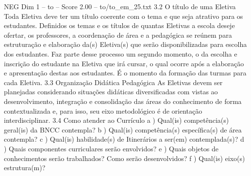 \begin{textsample}{NEG Dim 1 – to – Score 2.00 – to/to\_em\_25.txt}  \label{ex:f1_neg_032}
3.2 O título de uma Eletiva Toda Eletiva deve ter um título coerente com o tema e que seja atrativo para os estudantes.
Definidos os temas e os títulos de quantas Eletivas a escola deseje ofertar, os professores, a coordenação de área e a pedagógica se reúnem para estruturação e elaboração da(s) Eletiva(s) que serão disponibilizadas para escolha dos estudantes.
Faz parte desse processo um segundo momento, o da escolha e inscrição do estudante na Eletiva que irá cursar, o qual ocorre após a elaboração e apresentação destas aos estudantes.
É o momento da formação das turmas para cada Eletiva. 3.3 Organização Didática Pedagógica As Eletivas devem ser planejadas considerando situações didáticas diversificadas com vistas ao desenvolvimento, integração e consolidação das áreas do conhecimento de forma contextualizada e, para isso, seu eixo metodológico é de orientação interdisciplinar. 3.4 Como atender ao Currículo a ) Qual(is) competência(s) geral(is) da BNCC contempla? b ) Qual(is) competência(s) específica(s) de área contempla? c ) Qual(is) habilidade(s) de Itinerários a ser(em) contemplada(s)? d ) Quais componentes curriculares serão envolvidos? e ) Quais objetos de conhecimentos serão trabalhados?
Como serão desenvolvidos? f ) Qual(is) eixo(s) estrutura(m)?

\end{textsample}
